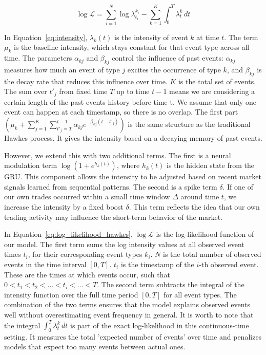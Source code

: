 \begin{equation}
    \log \mathcal{L} = \sum_{i=1}^{N} \log \lambda_{t_i}^{k_i} - \sum_{k=1}^{K} \int_{0}^{T} \lambda_t^{k} \, dt
    \label{eq:log_likelihood_hawkes}
\end{equation}

In Equation~\ref{eq:intensity}, $\lambda_k(t)$ is the intensity of event $k$ at time $t$. The term $\mu_k$ is the baseline intensity, which stays constant for that event type across all time. The parameters $\alpha_{kj}$ and $\beta_{kj}$ control the influence of past events: $\alpha_{kj}$ measures how much an event of type $j$ excites the occurrence of type $k$, and $\beta_{kj}$ is the decay rate that reduces this influence over time. $K$ is the total set of events. The sum over $t'_j$ from fixed time $T$ up to time $t-1$ means we are considering a certain length of the past events history before time t. We assume that only one event can happen at each timestamp, so there is no overlap. The first part $(\mu_k + \sum_{j=1}^{K} \sum_{t'_j=T}^{t-1} \alpha_{kj} e^{-\beta_{kj}(t - t'_j)})$ is the same structure as the traditional Hawkes process. It gives the intensity based on a decaying memory of past events. 

However, we extend this with two additional terms. The first is a neural modulation term \( \log(1 + e^{h_k(t)}) \), where \( h_k(t) \) is the hidden state from the GRU. This component allows the intensity to be adjusted based on recent market signals learned from sequential patterns. The second is a spike term $\delta$. If one of our own trades occurred within a small time window \( \Delta \) around time \( t \), we increase the intensity by a fixed boost \( \delta \). This term reflects the idea that our own trading activity may influence the short-term behavior of the market.

In Equation~\ref{eq:log_likelihood_hawkes}, \( \log \mathcal{L} \) is the log-likelihood function of our model. The first term sums the log intensity values at all observed event times \( t_i \), for their corresponding event types \( k_i \). $N$ is the total number of observed events in the time interval \([0, T]\). $t_i$ is the timestamp of the $i$-th observed event. These are the times at which events occur, such that $0<t_1<t_2<...<t_i<...<T$.
The second term subtracts the integral of the intensity function over the full time period \([0, T]\) for all event types. The combination of the two terms ensures that the model explains observed events well without overestimating event frequency in general. It is worth to note that the integral $\int_{0}^{T} \lambda_t^{k} \, dt$ is part of the exact log-likelihood in this continuous-time setting. It measures the total 'expected number of events' over time and penalizes models that expect too many events between actual ones.



